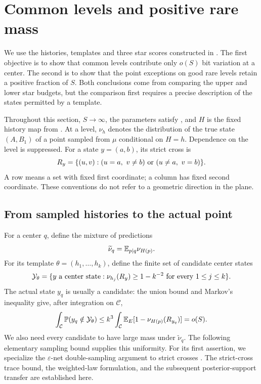 \section{Common levels and positive rare mass}\label{sec:common}

We use the histories, templates and three star scores constructed in
. The first objective is to show that common levels contribute
only \(o(S)\) bit variation at a center. The second is to show that the point
exceptions on good rare levels retain a positive fraction of \(S\). Both
conclusions come from comparing the upper and lower star budgets, but the
comparison first requires a precise description of the states permitted by a
template.

Throughout this section, \(S\to\infty\), the parameters satisfy
, and \(H\) is the fixed history map from
. At a level, \(\nu_h\) denotes the distribution of
the true state \((A,B_1)\) of a point sampled from \(\mu\) conditional on
\(H=h\). Dependence on the level is suppressed. For a state \(y=(a,b)\), its
strict cross is
\[
 R_y=\set{(u,v):(u=a,\ v\ne b)\ \text{or}\ (u\ne a,\ v=b)}.
\]
A row means a set with fixed first coordinate; a column has fixed second
coordinate. These conventions do not refer to a geometric direction in the
plane.

\subsection{From sampled histories to the actual point}

For a center \(q\), define the mixture of predictions
\[
 \widetilde\nu_q=\mathbb E_{p\mid q}\nu_{H(p)}.
\]
For its template \(\theta=(h_1,\ldots,h_k)\), define the finite set of candidate
center states
\begin{equation}\label{com:candidates}
 \mathcal Y_\theta
 =\{y\text{ a center state}:\nu_{h_j}(R_y)\ge1-k^{-2}
                      \text{ for every }1\le j\le k\}.
\end{equation}
The actual state \(y_q\) is usually a candidate: the union bound and Markov's
inequality give, after integration on \(\mathcal C\),
\begin{equation}\label{com:actual-candidate}
 \int_{\mathcal C}\mathbb P(y_q\notin\mathcal Y_\theta)
 \le k^3\int_{\mathcal C}
       \mathbb E_E[1-\nu_{H(p)}(R_{y_q})]=o(S).
\end{equation}
We also need every candidate to have large mass under \(\widetilde\nu_q\).
The following elementary sampling bound supplies this uniformity.
For its first assertion, we specialize the \(\varepsilon\)-net
double-sampling argument to strict crosses
\cite[Lemmas~3.4--3.5]{HausslerWelzl1987}.
The strict-cross trace bound, the weighted-law formulation, and the subsequent
posterior-support transfer are established here.

